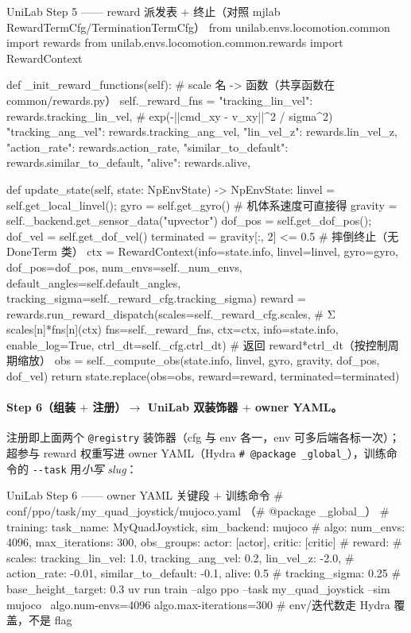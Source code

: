 \begin{codebox}[Python]{UniLab Step 5 —— reward 派发表 $+$ 终止（对照 mjlab RewardTermCfg/TerminationTermCfg）}
from unilab.envs.locomotion.common import rewards
from unilab.envs.locomotion.common.rewards import RewardContext

def _init_reward_functions(self):                # scale 名 -> 函数（共享函数在 common/rewards.py）
    self._reward_fns = {
        "tracking_lin_vel": rewards.tracking_lin_vel,   # exp(-||cmd_xy - v_xy||^2 / sigma^2)
        "tracking_ang_vel": rewards.tracking_ang_vel,
        "lin_vel_z":        rewards.lin_vel_z,
        "action_rate":      rewards.action_rate,
        "similar_to_default": rewards.similar_to_default,
        "alive":            rewards.alive,
    }

def update_state(self, state: NpEnvState) -> NpEnvState:
    linvel = self.get_local_linvel(); gyro = self.get_gyro()     # 机体系速度可直接得
    gravity = self._backend.get_sensor_data("upvector")
    dof_pos = self.get_dof_pos(); dof_vel = self.get_dof_vel()
    terminated = gravity[:, 2] <= 0.5                            # 摔倒终止（无 DoneTerm 类）
    ctx = RewardContext(info=state.info, linvel=linvel, gyro=gyro, dof_pos=dof_pos,
                        num_envs=self._num_envs, default_angles=self.default_angles,
                        tracking_sigma=self._reward_cfg.tracking_sigma)
    reward = rewards.run_reward_dispatch(scales=self._reward_cfg.scales,   # Σ scales[n]*fns[n](ctx)
                fns=self._reward_fns, ctx=ctx, info=state.info,
                enable_log=True, ctrl_dt=self._cfg.ctrl_dt)       # 返回 reward*ctrl_dt（按控制周期缩放）
    obs = self._compute_obs(state.info, linvel, gyro, gravity, dof_pos, dof_vel)
    return state.replace(obs=obs, reward=reward, terminated=terminated)
\end{codebox}

\paragraph{Step 6（组装 $+$ 注册）$\to$ UniLab 双装饰器 $+$ owner YAML。}注册即上面两个 \verb|@registry| 装饰器（cfg 与 env 各一，env 可多后端各标一次）；超参与 reward 权重写进 owner YAML（Hydra \verb|# @package _global_|），训练命令的 \verb|--task| 用\emph{小写 slug}：

\begin{codebox}[bash]{UniLab Step 6 —— owner YAML 关键段 $+$ 训练命令}
# conf/ppo/task/my_quad_joystick/mujoco.yaml （# @package _global_）
#   training: {task_name: MyQuadJoystick, sim_backend: mujoco}
#   algo: {num_envs: 4096, max_iterations: 300, obs_groups: {actor: [actor], critic: [critic]}}
#   reward:
#     scales: {tracking_lin_vel: 1.0, tracking_ang_vel: 0.2, lin_vel_z: -2.0,
#              action_rate: -0.01, similar_to_default: -0.1, alive: 0.5}
#     tracking_sigma: 0.25
#     base_height_target: 0.3
uv run train --algo ppo --task my_quad_joystick --sim mujoco \
    algo.num-envs=4096 algo.max-iterations=300         # env/迭代数走 Hydra 覆盖，不是 flag
\end{codebox}

